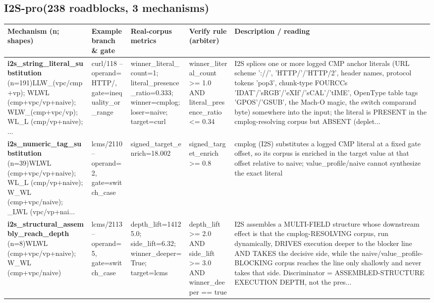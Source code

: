 \documentclass[7pt]{extarticle}
\begin{document}
\subsection*{I2S-pro\quad(238 roadblocks, 3 mechanisms)}
{\scriptsize\begin{longtable}{@{}p{3.3cm}p{3.6cm}p{4.4cm}p{4.2cm}p{6.6cm}@{}}
\toprule \textbf{Mechanism (n; shapes)}&\textbf{Example branch \& gate}&\textbf{Real-corpus metrics}&\textbf{Verify rule (arbiter)}&\textbf{Description / reading}\\\midrule\endhead
\textbf{i2s\_\allowbreak string\_\allowbreak literal\_\allowbreak substitution} (n=191)\newline LLW\_\allowbreak  (vpc/cmp+vp); WLWL (cmp+vpc/vp+naive); WLW\_\allowbreak  (cmp+vpc/vp); WL\_\allowbreak L (cmp/vp+naive); ... & curl/118 -- operand=HTTP/, gate=inequality\_\allowbreak or\_\allowbreak range & winner\_\allowbreak literal\_\allowbreak count=1; literal\_\allowbreak presence\_\allowbreak ratio=0.333; winner=cmplog; loser=naive; target=curl & winner\_\allowbreak literal\_\allowbreak count \textgreater{}= 1.0 AND literal\_\allowbreak presence\_\allowbreak ratio \textless{}= 0.34 & I2S splices one or more logged CMP anchor literals (URL scheme '://', 'HTTP/'/'HTTP/2', header names, protocol tokens 'pop3', chunk-type FOURCCs 'IDAT'/'sRGB'/'eXIf'/'sCAL'/'tIME', OpenType table tags 'GPOS'/'GSUB', the Mach-O magic, the switch comparand byte) somewhere into the input; the literal is PRESENT in the cmplog-resolving corpus but ABSENT (deplet...\\\midrule
\textbf{i2s\_\allowbreak numeric\_\allowbreak tag\_\allowbreak substitution} (n=39)\newline WLWL (cmp+vpc/vp+naive); WL\_\allowbreak L (cmp/vp+naive); W\_\allowbreak WL (cmp+vpc/naive); \_\allowbreak LWL (vpc/vp+nai... & lcms/2110 -- operand=2, gate=switch\_\allowbreak case & signed\_\allowbreak target\_\allowbreak enrich=18.002 & signed\_\allowbreak target\_\allowbreak enrich \textgreater{}= 0.8 & cmplog (I2S) substitutes a logged CMP literal at a fixed gate offset, so its corpus is enriched in the target value at that offset relative to naive; value\_\allowbreak profile/naive cannot synthesize the exact literal\\\midrule
\textbf{i2s\_\allowbreak structural\_\allowbreak assembly\_\allowbreak reach\_\allowbreak depth} (n=8)\newline WLWL (cmp+vpc/vp+naive); W\_\allowbreak WL (cmp+vpc/naive) & lcms/2113 -- operand=5, gate=switch\_\allowbreak case & depth\_\allowbreak lift=14125.0; side\_\allowbreak lift=6.32; winner\_\allowbreak deeper=True; target=lcms & depth\_\allowbreak lift \textgreater{}= 2.0 AND side\_\allowbreak lift \textgreater{}= 3.0 AND winner\_\allowbreak deeper == true & I2S assembles a MULTI-FIELD structure whose downstream effect is that the cmplog-RESOLVING corpus, run dynamically, DRIVES execution deeper to the blocker line AND TAKES the decisive side, while the naive/value\_\allowbreak profile-BLOCKING corpus reaches the line only shallowly and never takes that side. Discriminator = ASSEMBLED-STRUCTURE EXECUTION DEPTH, not the pres...\\\midrule
\bottomrule\end{longtable}}\par\medskip
\end{document}
